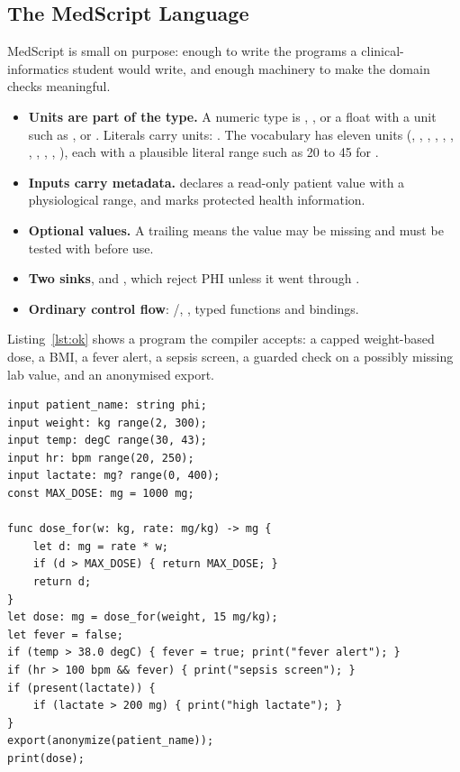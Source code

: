 \subsection{The MedScript Language}

MedScript is small on purpose: enough to write the programs a clinical-informatics student would write, and enough
machinery to make the domain checks meaningful.

\begin{itemize}
    \item \textbf{Units are part of the type.} A numeric type is , , or a float with a unit such
    as ,  or . Literals carry units: . The
    vocabulary has eleven units (, , , , , , ,
    , , , ), each with a plausible literal range such as 20 to 45 for .
    \item \textbf{Inputs carry metadata.}  declares a read-only patient value with
    a physiological range, and  marks protected health information.
    \item \textbf{Optional values.} A trailing  means the value may be missing and must be tested with
     before use.
    \item \textbf{Two sinks},  and , which reject PHI unless it went through .
    \item \textbf{Ordinary control flow}: /, , typed functions and  bindings.
\end{itemize}

Listing~\ref{lst:ok} shows a program the compiler accepts: a capped weight-based dose, a BMI, a fever alert, a sepsis
screen, a guarded check on a possibly missing lab value, and an anonymised export.

\begin{lstlisting}[language=MedScript,caption={A valid MedScript program (\texttt{examples/triage\_ok.med}).},label={lst:ok}]
input patient_name: string phi;
input weight: kg range(2, 300);
input temp: degC range(30, 43);
input hr: bpm range(20, 250);
input lactate: mg? range(0, 400);
const MAX_DOSE: mg = 1000 mg;

func dose_for(w: kg, rate: mg/kg) -> mg {
    let d: mg = rate * w;
    if (d > MAX_DOSE) { return MAX_DOSE; }
    return d;
}
let dose: mg = dose_for(weight, 15 mg/kg);
let fever = false;
if (temp > 38.0 degC) { fever = true; print("fever alert"); }
if (hr > 100 bpm && fever) { print("sepsis screen"); }
if (present(lactate)) {
    if (lactate > 200 mg) { print("high lactate"); }
}
export(anonymize(patient_name));
print(dose);
\end{lstlisting}

